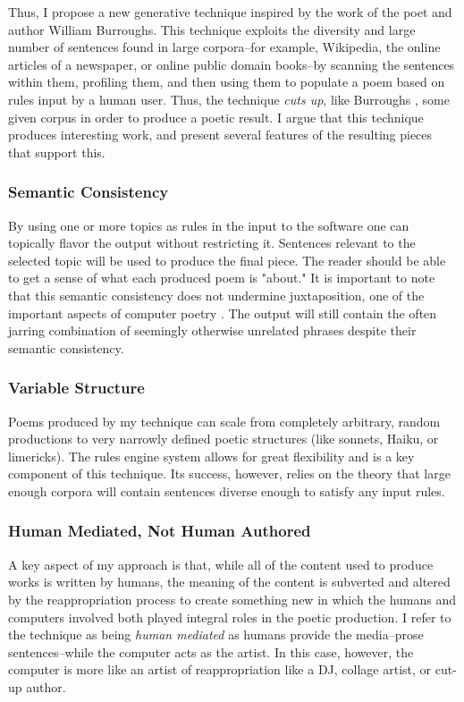 \documentclass[10pt]{article}
\begin{document}
Thus, I propose a new generative technique inspired by the work of the poet and
author William Burroughs. This technique exploits the diversity and large
number of sentences found in large corpora--for example, Wikipedia, the online
articles of a newspaper, or online public domain books--by scanning the
sentences within them, profiling them, and then using them to populate a poem
based on rules input by a human user. Thus, the technique \emph{cuts up}, like
Burroughs \cite{wikiCutup}, some given corpus in order to produce a poetic
result. I argue that this technique produces interesting work, and present
several features of the resulting pieces that support this.

\subsubsection{Semantic Consistency}
By using one or more topics as rules in the input to the software one can
topically flavor the output without restricting it. Sentences relevant to the
selected topic will be used to produce the final piece. The reader should be
able to get a sense of what each produced poem is "about." It is important to
note that this semantic consistency does not undermine juxtaposition, one of
the important aspects of computer poetry \cite{Hart96}. The output will still
contain the often jarring combination of seemingly otherwise unrelated phrases
despite their semantic consistency.

\subsubsection{Variable Structure}
Poems produced by my technique can scale from completely arbitrary, random
productions to very narrowly defined poetic structures (like sonnets, Haiku, or
limericks). The rules engine system allows for great flexibility and is a key
component of this technique. Its success, however, relies on the theory that
large enough corpora will contain sentences diverse enough to satisfy any input
rules.

\subsubsection{Human Mediated, Not Human Authored}
A key aspect of my approach is that, while all of the content used to produce
works is written by humans, the meaning of the content is subverted and altered
by the reappropriation process to create something new in which the humans and
computers involved both played integral roles in the poetic production. I refer
to the technique as being \emph{human mediated} as humans provide the
media--prose sentences--while the computer acts as the artist. In this case,
however, the computer is more like an artist of reappropriation like a DJ,
collage artist, or cut-up author.
\end{document}
